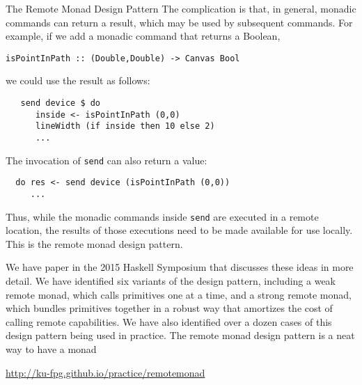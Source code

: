\begin{hcarentry}[new]{The Remote Monad Design Pattern}
The complication is that, in general, monadic commands can return a
result, which may be used by subsequent commands.  For example, if we
add a monadic command that returns a Boolean,

\begin{verbatim}
isPointInPath :: (Double,Double) -> Canvas Bool
\end{verbatim}

we could use the result as follows:

\begin{verbatim}
   send device $ do
      inside <- isPointInPath (0,0)
      lineWidth (if inside then 10 else 2)
      ...
\end{verbatim}

The invocation of \verb`send` can also return a value:

\begin{verbatim}
  do res <- send device (isPointInPath (0,0))
     ...
\end{verbatim}

Thus, while the monadic commands inside \verb`send` are executed in a
remote location, the results of those executions need to be made
available for use locally.  This is the remote monad design
pattern.

We have paper in the 2015 Haskell Symposium that discusses these ideas in more detail.
We have identified six variants of the design pattern, including
a weak remote monad, which calls primitives one at a time, and
a strong remote monad, which bundles primitives together in a robust way that
amortizes the cost of calling remote capabilities.
We have also identified over a dozen cases of this design pattern being used in practice. 
The remote monad design pattern is a neat way to have a monad 

\FurtherReading
\begin{compactitem}
\item
  \url{http://ku-fpg.github.io/practice/remotemonad}
\end{compactitem}
\end{hcarentry}
